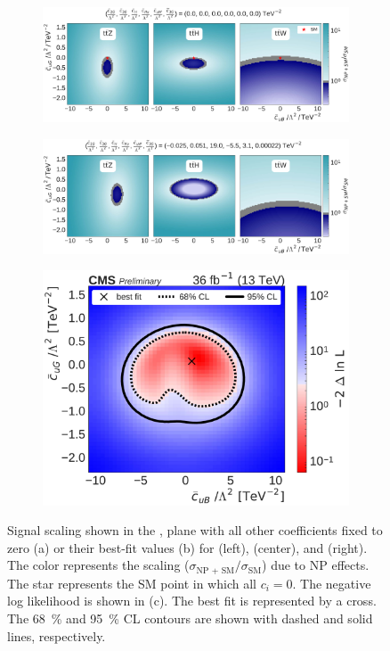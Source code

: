 \begin{figure}
  \vspace{-1cm}
  \begin{subfigure}{\linewidth}
    \centering
    \includegraphics[width=\linewidth]{figures/thirteen-TeV/scaling-frozen/cuB_cuG}
    \caption{}
  \end{subfigure}
  \begin{subfigure}{\linewidth}
    \centering
    \includegraphics[width=\linewidth]{figures/thirteen-TeV/scaling/cuB_cuG}
    \caption{}
  \end{subfigure}
  \begin{subfigure}{\linewidth}
    \centering
    \includegraphics[width=0.6\linewidth]{figures/thirteen-TeV/nll/cuB_cuG}
    \caption{}
  \end{subfigure}
  \vspace{-1cm}
  \setlength{\capwidth}{15cm}
  \caption[Signal scaling and profile likelihood scan in the \cuB, \cuG plane]{Signal scaling shown
  in the \cuB, \cuG plane with all other coefficients fixed to zero (a) or their best-fit values (b)
  for \ttZ (left), \ttH (center), and \ttW (right). The color represents the scaling ($\sigma_\text{NP
  + SM} / \sigma_\text{SM}$) due to NP effects. The star represents the SM point in which all $c_i=0$.
  The negative log likelihood is shown in (c). The best fit is represented by a cross. The
  \SI{68}{\percent} and \SI{95}{\percent} CL contours are shown with dashed and solid lines,
  respectively.}
\end{figure}

